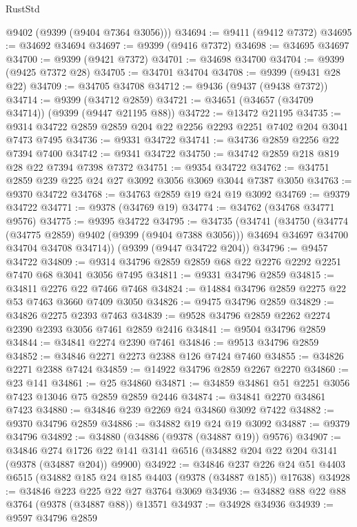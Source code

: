 \begin{lexlean}{RustStd}
\begin{coremodule}
      @9402
      (@9399 (@9404 @7364 @3056)))
@34694 := @9411 (@9412 @7372)
@34695 := @34692 @34694
@34697 := @9399 (@9416 @7372)
@34698 := @34695 @34697
@34700 := @9399 (@9421 @7372)
@34701 := @34698 @34700
@34704 := @9399 (@9425 @7372 @28)
@34705 := @34701 @34704
@34708 := @9399 (@9431 @28 @22)
@34709 := @34705 @34708
@34712 := @9436 (@9437 (@9438 @7372))
@34714 := @9399 (@34712 @2859)
@34721 := @34651 (@34657 (@34709 @34714)) (@9399 (@9447 @21195 @88))
@34722 := @13472 @21195
@34735 := @9314 @34722 @2859 @2859 @204 @22 @2256 @2293 @2251 @7402 @204 @3041 @7473 @7495
@34736 := @9331 @34722
@34741 := @34736 @2859 @2256 @22 @7394 @7400
@34742 := @9341 @34722
@34750 := @34742 @2859 @218 @819 @28 @22 @7394 @7398 @7372
@34751 := @9354 @34722
@34762 := @34751 @2859 @239 @225 @24 @27 @3092 @3056 @3069 @3044 @7387 @3050
@34763 := @9370 @34722
@34768 := @34763 @2859 @19 @24 @19 @3092
@34769 := @9379 @34722
@34771 := @9378 (@34769 @19)
@34774 := @34762 (@34768 @34771 @9576)
@34775 := @9395 @34722
@34795 := @34735
    (@34741
      (@34750
        (@34774 (@34775 @2859) @9402 (@9399 (@9404 @7388 @3056)))
        @34694
        @34697
        @34700
        @34704
        @34708
        @34714))
    (@9399 (@9447 @34722 @204))
@34796 := @9457 @34722
@34809 := @9314 @34796 @2859 @2859 @68 @22 @2276 @2292 @2251 @7470 @68 @3041 @3056 @7495
@34811 := @9331 @34796 @2859
@34815 := @34811 @2276 @22 @7466 @7468
@34824 := @14884 @34796 @2859 @2275 @22 @53 @7463 @3660 @7409 @3050
@34826 := @9475 @34796 @2859
@34829 := @34826 @2275 @2393 @7463
@34839 := @9528 @34796 @2859 @2262 @2274 @2390 @2393 @3056 @7461 @2859 @2416
@34841 := @9504 @34796 @2859
@34844 := @34841 @2274 @2390 @7461
@34846 := @9513 @34796 @2859
@34852 := @34846 @2271 @2273 @2388 @126 @7424 @7460
@34855 := @34826 @2271 @2388 @7424
@34859 := @14922 @34796 @2859 @2267 @2270
@34860 := @23 @141
@34861 := @25 @34860
@34871 := @34859 @34861 @51 @2251 @3056 @7423 @13046 @75 @2859 @2859 @2446
@34874 := @34841 @2270 @34861 @7423
@34880 := @34846 @239 @2269 @24 @34860 @3092 @7422
@34882 := @9370 @34796 @2859
@34886 := @34882 @19 @24 @19 @3092
@34887 := @9379 @34796
@34892 := @34880 (@34886 (@9378 (@34887 @19)) @9576)
@34907 := @34846
    @274
    @1726
    @22
    @141
    @3141
    @6516
    (@34882 @204 @22 @204 @3141 (@9378 (@34887 @204)) @9900)
@34922 := @34846
    @237
    @226
    @24
    @51
    @4403
    @6515
    (@34882 @185 @24 @185 @4403 (@9378 (@34887 @185)) @17638)
@34928 := @34846 @223 @225 @22 @27 @3764 @3069
@34936 := @34882 @88 @22 @88 @3764 (@9378 (@34887 @88)) @13571
@34937 := @34928 @34936
@34939 := @9597 @34796 @2859

\end{coremodule}
\end{lexlean}
